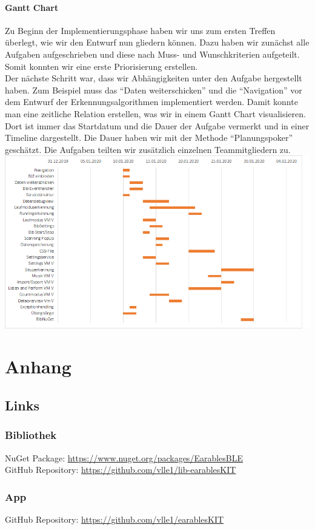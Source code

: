 \documentclass[a4paper,12pt]{article}
\begin{document}
\paragraph{Gantt Chart}
Zu Beginn der Implementierungsphase haben wir uns zum ersten Treffen überlegt, wie wir den Entwurf nun gliedern können. Dazu haben wir zunächst alle Aufgaben aufgeschrieben und diese nach Muss- und Wunschkriterien aufgeteilt. Somit konnten wir eine erste Priorisierung erstellen.\\
 Der nächste Schritt war, dass wir Abhängigkeiten unter den Aufgabe hergestellt haben. Zum Beispiel muss das ``Daten weiterschicken'' und die ``Navigation'' vor dem Entwurf der Erkennungsalgorithmen implementiert werden. Damit konnte man eine zeitliche Relation erstellen, was wir in einem Gantt Chart visualisieren. Dort ist immer das Startdatum und die Dauer der Aufgabe vermerkt und in einer Timeline dargestellt.
Die Dauer haben wir mit der Methode ``Planungspoker'' geschätzt. Die Aufgaben teilten wir zusätzlich einzelnen Teammitgliedern zu.
\newline
\newline
\includegraphics[width=\textwidth, height=0.5\textheight]{bilder/Implementierungsplan.png}

\section{Anhang}
\subsection{Links}
\subsubsection{Bibliothek}
NuGet Package: \url{https://www.nuget.org/packages/EarablesBLE}\\
GitHub Repository: \url{https://github.com/vlle1/lib-earablesKIT}
\subsubsection{App}
GitHub Repository: \url{https://github.com/vlle1/earablesKIT}


\printglossaries
{}
\end{document}
